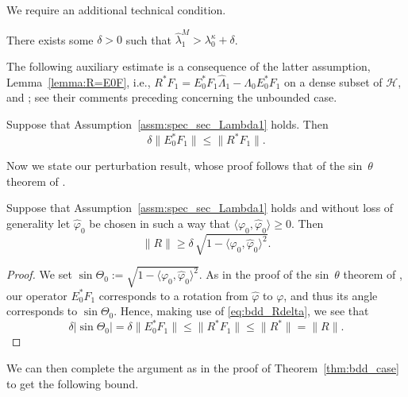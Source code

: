 \documentclass{aptpub}
\newcommand{\lkap}{\lambda_0^\kappa}
\renewcommand{\H}{\mathcal H}
\begin{document}
We require an additional technical condition.
\begin{assumption}
    There exists some $\delta >0$ such that $\widehat \lambda_1^M >\lkap+\delta$.
    \label{assm:spec_sec_Lambda1}
\end{assumption}
The following auxiliary estimate is a consequence of the latter assumption, Lemma~\ref{lemma:R=E0F}, i.e., $R^* F_1 = E_0^* F_1 \widehat \Lambda_1 - \Lambda_0 E_0^* F_1$ on a dense subset of $\H$, and \cite[Theorem 5.1]{DavisKahan1970}; see their comments preceding \cite[Theorem 5.2]{DavisKahan1970} concerning the unbounded case.
\begin{lemma}
    Suppose that Assumption~\ref{assm:spec_sec_Lambda1} holds. Then 
    \begin{equation}
        \delta \|E_0^* F_1\|\le \|R^* F_1\|.
        \label{eq:bdd_Rdelta}
    \end{equation}
\end{lemma}


Now we state our perturbation result, whose proof follows that of the sin~$\theta$ theorem of \cite{DavisKahan1970}.

\begin{theorem}
    Suppose that Assumption~\ref{assm:spec_sec_Lambda1} holds and without loss of generality let $\widehat \varphi_0$ be chosen in such a way that $\langle \varphi_0, \widehat \varphi_0\rangle \geq 0$. Then
    \begin{equation*}
        \|R\|\ge \delta\, \sqrt{ 1- \langle \varphi_0, \widehat \varphi_0\rangle^2 }.
    \end{equation*}
\end{theorem}
\begin{proof}
     We set $\sin \Theta_0 := \sqrt{1-\langle \varphi_0, \widehat \varphi_0\rangle^2}$. As in the proof of the sin~$\theta$ theorem of \cite{DavisKahan1970}, our operator $E^*_0 F_1$ corresponds to a rotation from $\widehat \varphi$ to $\varphi$, and thus its angle corresponds to $\sin \Theta_0$. Hence, making use of \eqref{eq:bdd_Rdelta}, we see that
     \begin{equation*}
        \delta |\sin\Theta_0| = \delta \|E^*_0 F_1\| \le\|R^* F_1\| \le \|R^*\| = \|R\|.
     \end{equation*}
\end{proof}
We can then complete the argument as in the proof of Theorem~\ref{thm:bdd_case} to get the following bound.
\end{document}
